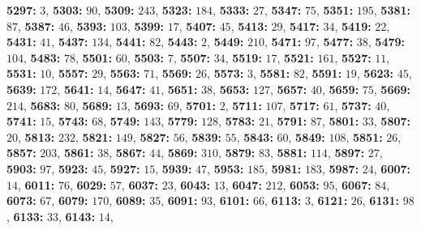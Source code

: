 \textsf{\bfseries 5297:} $3$, \textsf{\bfseries 5303:} $90$, \textsf{\bfseries 5309:} $243$, \textsf{\bfseries 5323:} $184$, \textsf{\bfseries 5333:} $27$, \textsf{\bfseries 5347:} $75$, \textsf{\bfseries 5351:} $195$, \textsf{\bfseries 5381:} $87$, \textsf{\bfseries 5387:} $46$, \textsf{\bfseries 5393:} $103$, \textsf{\bfseries 5399:} $17$, \textsf{\bfseries 5407:} $45$, \textsf{\bfseries 5413:} $29$, \textsf{\bfseries 5417:} $34$, \textsf{\bfseries 5419:} $22$, \textsf{\bfseries 5431:} $41$, \textsf{\bfseries 5437:} $134$, \textsf{\bfseries 5441:} $82$, \textsf{\bfseries 5443:} $2$, \textsf{\bfseries 5449:} $210$, \textsf{\bfseries 5471:} $97$, \textsf{\bfseries 5477:} $38$, \textsf{\bfseries 5479:} $104$, \textsf{\bfseries 5483:} $78$, \textsf{\bfseries 5501:} $60$, \textsf{\bfseries 5503:} $7$, \textsf{\bfseries 5507:} $34$, \textsf{\bfseries 5519:} $17$, \textsf{\bfseries 5521:} $161$, \textsf{\bfseries 5527:} $11$, \textsf{\bfseries 5531:} $10$, \textsf{\bfseries 5557:} $29$, \textsf{\bfseries 5563:} $71$, \textsf{\bfseries 5569:} $26$, \textsf{\bfseries 5573:} $3$, \textsf{\bfseries 5581:} $82$, \textsf{\bfseries 5591:} $19$, \textsf{\bfseries 5623:} $45$, \textsf{\bfseries 5639:} $172$, \textsf{\bfseries 5641:} $14$, \textsf{\bfseries 5647:} $41$, \textsf{\bfseries 5651:} $38$, \textsf{\bfseries 5653:} $127$, \textsf{\bfseries 5657:} $40$, \textsf{\bfseries 5659:} $75$, \textsf{\bfseries 5669:} $214$, \textsf{\bfseries 5683:} $80$, \textsf{\bfseries 5689:} $13$, \textsf{\bfseries 5693:} $69$, \textsf{\bfseries 5701:} $2$, \textsf{\bfseries 5711:} $107$, \textsf{\bfseries 5717:} $61$, \textsf{\bfseries 5737:} $40$, \textsf{\bfseries 5741:} $15$, \textsf{\bfseries 5743:} $68$, \textsf{\bfseries 5749:} $143$, \textsf{\bfseries 5779:} $128$, \textsf{\bfseries 5783:} $21$, \textsf{\bfseries 5791:} $87$, \textsf{\bfseries 5801:} $33$, \textsf{\bfseries 5807:} $20$, \textsf{\bfseries 5813:} $232$, \textsf{\bfseries 5821:} $149$, \textsf{\bfseries 5827:} $56$, \textsf{\bfseries 5839:} $55$, \textsf{\bfseries 5843:} $60$, \textsf{\bfseries 5849:} $108$, \textsf{\bfseries 5851:} $26$, \textsf{\bfseries 5857:} $203$, \textsf{\bfseries 5861:} $38$, \textsf{\bfseries 5867:} $44$, \textsf{\bfseries 5869:} $310$, \textsf{\bfseries 5879:} $83$, \textsf{\bfseries 5881:} $114$, \textsf{\bfseries 5897:} $27$, \textsf{\bfseries 5903:} $97$, \textsf{\bfseries 5923:} $45$, \textsf{\bfseries 5927:} $15$, \textsf{\bfseries 5939:} $47$, \textsf{\bfseries 5953:} $185$, \textsf{\bfseries 5981:} $183$, \textsf{\bfseries 5987:} $24$, \textsf{\bfseries 6007:} $14$, \textsf{\bfseries 6011:} $76$, \textsf{\bfseries 6029:} $57$, \textsf{\bfseries 6037:} $23$, \textsf{\bfseries 6043:} $13$, \textsf{\bfseries 6047:} $212$, \textsf{\bfseries 6053:} $95$, \textsf{\bfseries 6067:} $84$, \textsf{\bfseries 6073:} $67$, \textsf{\bfseries 6079:} $170$, \textsf{\bfseries 6089:} $35$, \textsf{\bfseries 6091:} $93$, \textsf{\bfseries 6101:} $66$, \textsf{\bfseries 6113:} $3$, \textsf{\bfseries 6121:} $26$, \textsf{\bfseries 6131:} $98$, \textsf{\bfseries 6133:} $33$, \textsf{\bfseries 6143:} $14$, 
